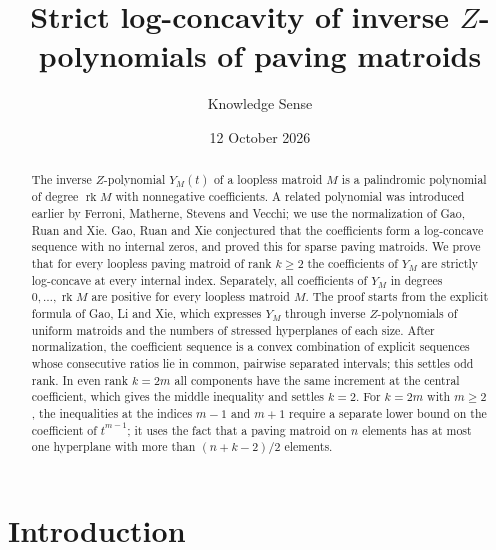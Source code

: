 \documentclass[11pt]{amsart}
\theoremstyle{definition}
\theoremstyle{remark}
\numberwithin{equation}{section}
\DeclareMathOperator{\rk}{rk}
\begin{document}
\title[Inverse \texorpdfstring{$Z$}{Z}-polynomials of paving matroids]{Strict log-concavity of inverse \texorpdfstring{$Z$}{Z}-polynomials of paving matroids}

\author{Knowledge Sense}

\date{12 October 2026}


\begin{abstract}
The inverse $Z$-polynomial $Y_M(t)$ of a loopless matroid $M$ is a palindromic polynomial of degree $\rk M$ with nonnegative coefficients. A related polynomial was introduced earlier by Ferroni, Matherne, Stevens and Vecchi; we use the normalization of Gao, Ruan and Xie. Gao, Ruan and Xie conjectured that the coefficients form a log-concave sequence with no internal zeros, and proved this for sparse paving matroids. We prove that for every loopless paving matroid of rank $k\ge 2$ the coefficients of $Y_M$ are strictly log-concave at every internal index. Separately, all coefficients of $Y_M$ in degrees $0,\dots,\rk M$ are positive for every loopless matroid $M$. The proof starts from the explicit formula of Gao, Li and Xie, which expresses $Y_M$ through inverse $Z$-polynomials of uniform matroids and the numbers of stressed hyperplanes of each size. After normalization, the coefficient sequence is a convex combination of explicit sequences whose consecutive ratios lie in common, pairwise separated intervals; this settles odd rank. In even rank $k=2m$ all components have the same increment at the central coefficient, which gives the middle inequality and settles $k=2$. For $k=2m$ with $m\ge2$, the inequalities at the indices $m-1$ and $m+1$ require a separate lower bound on the coefficient of $t^{m-1}$; it uses the fact that a paving matroid on $n$ elements has at most one hyperplane with more than $(n+k-2)/2$ elements.
\end{abstract}

\maketitle

\section{Introduction}
\end{document}
